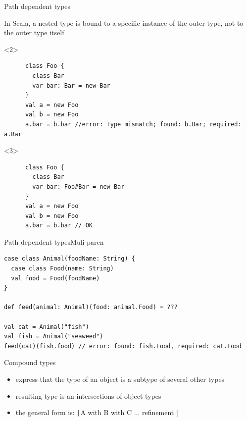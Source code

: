 \documentclass[aspectratio=169]{beamer}
\begin{document}
\begin{frame}[fragile]{Path dependent types}
  \vspace{-1em}
  \begin{block}{}
    In Scala, a nested type is bound to a specific \alert{instance}  of the outer type, not to the outer type
    itself
  \end{block}
  \begin{onlyenv}<2>
    \begin{verbatim}
      class Foo {
        class Bar
        var bar: Bar = new Bar
      }
      val a = new Foo
      val b = new Foo
      a.bar = b.bar //error: type mismatch; found: b.Bar; required: a.Bar
    \end{verbatim}
  \end{onlyenv}
  \begin{onlyenv}<3>
    \begin{verbatim}
      class Foo {
        class Bar
        var bar: Foo#Bar = new Bar
      }
      val a = new Foo
      val b = new Foo
      a.bar = b.bar // OK
    \end{verbatim}
  \end{onlyenv}
\end{frame}

\begin{frame}[fragile]{Path dependent types}{Muli-paren}
\begin{verbatim}
case class Animal(foodName: String) { 
  case class Food(name: String)
  val food = Food(foodName)
}

def feed(animal: Animal)(food: animal.Food) = ???

val cat = Animal("fish")
val fish = Animal("seaweed")
feed(cat)(fish.food) // error: found: fish.Food, required: cat.Food
\end{verbatim}
\end{frame}

\begin{frame}{Compound types}
  \begin{itemize}
    \item express that the type of an object is a subtype of several other types
    \item resulting type is an intersections of object types
    \item the general form is: \texttt |A with B with C ... { refinement }|
  \end{itemize}
\end{frame}
\end{document}
